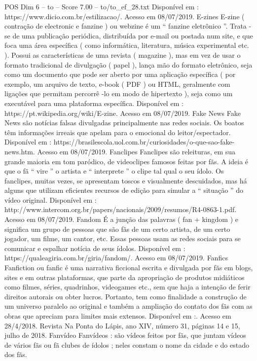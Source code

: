 \begin{textsample}{POS Dim 6 – to – Score 7.00 – to/to\_ef\_28.txt}
Disponível em : https://www.dicio.com.br/estilizacao/.
Acesso em 08/07/2019.
E-zines E-zine ( contração de electronic e fanzine ) ou webzine é um “ fanzine eletrônico ”.
Trata -se de uma publicação periódica, distribuída por e-mail ou postada num site, e que foca uma área específica ( como informática, literatura, música experimental etc. ).
Possui as características de uma revista ( magazine ), mas em vez de usar o formato tradicional de divulgação ( papel ), lança mão do formato eletrônico, seja como um documento que pode ser aberto por uma aplicação específica ( por exemplo, um arquivo de texto, e-book ( PDF ) ou HTML, geralmente com ligações que permitam percorrê -lo em modo de hipertexto ), seja como um executável para uma plataforma específica.
Disponível em : https://pt.wikipedia.org/wiki/E-zine.
Acesso em 08/07/2019.
Fake News Fake News são notícias falsas divulgadas principalmente nas redes sociais.
Os boatos têm informações irreais que apelam para o emocional do leitor/espectador.
Disponível em : https://brasilescola.uol.com.br/curiosidades/o-que-sao-fake-news.htm.
Acesso em 08/07/2019.
Fanclipes Fanclipes são releituras, em sua grande maioria em tom paródico, de videoclipes famosos feitas por fãs.
A ideia é que o fã “ vire ” o artista e “ interprete ” o clipe tal qual o seu ídolo.
Os fanclipes, muitas vezes, se apresentam toscos e visualmente descuidados, mas há alguns que utilizam eficientes recursos de edição para simular a “ situação ” do vídeo original.
Disponível em : http://www.intercom.org.br/papers/nacionais/2009/resumos/R4-0863-1.pdf.
Acesso em 08/07/2019.
Fandom É a junção das palavras ( fan + kingdom ) e significa um grupo de pessoas que são fãs de um certo artista, de um certo jogador, um filme, um cantor, etc.
Essas pessoas usam as redes sociais para se comunicar e espalhar notícia de seus ídolos.
Disponível em : https://qualeagiria.com.br/giria/fandom/.
Acesso em 08/07/2019.
Fanfics Fanfiction ou fanfic é uma narrativa ficcional escrita e divulgada por fãs em blogs, sites e em outras plataformas, que parte da apropriação de produtos midiáticos como filmes, séries, quadrinhos, videogames etc., sem que haja a intenção de ferir direitos autorais ou obter lucros.
Portanto, tem como finalidade a construção de um universo paralelo ao original e também a ampliação do contato dos fãs com as obras que apreciam para limites mais extensos.
Disponível em :.
Acesso em 28/4/2018.
Revista Na Ponta do Lápis, ano XIV, número 31, páginas 14 e 15, julho de 2018.
Fanvídeo Fanvídeos : são vídeos feitos por fãs, que juntam vídeos de vários fãs ou fã clubes de ídolos ; neles constam o nome da cidade e do estado dos fãs.

\end{textsample}
